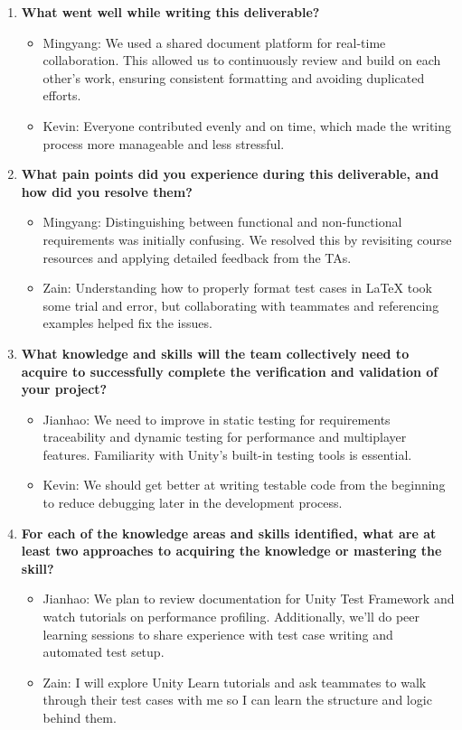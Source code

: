 \documentclass[12pt]{article}
\begin{document}
\begin{enumerate}
    \item \textbf{What went well while writing this deliverable?}
    \begin{itemize}
        \item Mingyang: We used a shared document platform for real-time collaboration. This allowed us to continuously review and build on each other’s work, ensuring consistent formatting and avoiding duplicated efforts.
        \item Kevin: Everyone contributed evenly and on time, which made the writing process more manageable and less stressful.
    \end{itemize}

    \item \textbf{What pain points did you experience during this deliverable, and how did you resolve them?}
    \begin{itemize}
        \item Mingyang: Distinguishing between functional and non-functional requirements was initially confusing. We resolved this by revisiting course resources and applying detailed feedback from the TAs.
        \item Zain: Understanding how to properly format test cases in LaTeX took some trial and error, but collaborating with teammates and referencing examples helped fix the issues.
    \end{itemize}

    \item \textbf{What knowledge and skills will the team collectively need to acquire to successfully complete the verification and validation of your project?}
    \begin{itemize}
        \item Jianhao: We need to improve in static testing for requirements traceability and dynamic testing for performance and multiplayer features. Familiarity with Unity's built-in testing tools is essential.
        \item Kevin: We should get better at writing testable code from the beginning to reduce debugging later in the development process.
    \end{itemize}

    \item \textbf{For each of the knowledge areas and skills identified, what are at least two approaches to acquiring the knowledge or mastering the skill?}
    \begin{itemize}
        \item Jianhao: We plan to review documentation for Unity Test Framework and watch tutorials on performance profiling. Additionally, we’ll do peer learning sessions to share experience with test case writing and automated test setup.
        \item Zain: I will explore Unity Learn tutorials and ask teammates to walk through their test cases with me so I can learn the structure and logic behind them.
    \end{itemize}
\end{enumerate}
\end{document}
